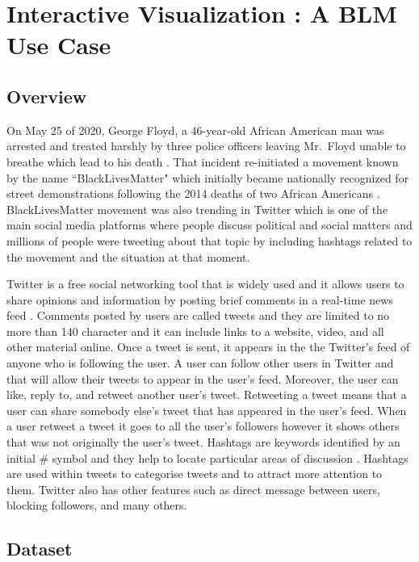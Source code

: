 \section{Interactive Visualization \cite{d3tool} : A BLM Use Case}


\subsection{Overview}

On May 25 of 2020, George Floyd, a 46-year-old African American man was arrested and treated harshly by three police officers leaving Mr.~Floyd unable to breathe which lead to his death \cite{dreyer2020death}. 
That incident re-initiated a movement known by the name ``BlackLivesMatter" which initially became nationally recognized for street demonstrations following the 2014 deaths of two African Americans \cite{garza2014herstory}. 
BlackLivesMatter movement was also trending in Twitter which is one of the main social media platforms where people discuss political and social matters and millions of people were tweeting about that topic by including hashtags related to the movement and the situation at that moment.

Twitter is a free social networking tool that is widely used and it allows users to share opinions and information by posting brief comments in a real-time news feed \cite{mistry2011critical, bristol2010twitter}. 
Comments posted by users are called tweets and they are limited to no more than 140 character and it can include links to a website, video, and all other material online. 
Once a tweet is sent, it appears in the the Twitter's feed of anyone who is following the user. A user can follow other users in Twitter and that will allow their tweets to appear in the user's feed. 
Moreover, the user can like, reply to, and retweet another user's tweet. Retweeting a tweet means that a user can share somebody else's tweet that has appeared in the user's feed. 
When a user retweet a tweet it goes to all the user's followers however it shows others that was not originally the user's tweet. Hashtags are keywords identified by an initial \# %
symbol and they help to locate particular areas of discussion \cite{bristol2010twitter}. Hashtags are used within tweets to categorise tweets and to attract more attention to them. 
Twitter also has other features such as direct message between users, blocking followers, and many others.


\subsection{Dataset}

